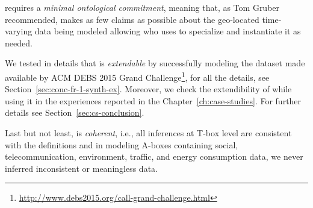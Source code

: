 \frappe{} requires a \textit{minimal ontological commitment}, meaning that, as Tom Gruber recommended, \frappe{} makes as few claims as possible about the geo-located time-varying data being modeled allowing who uses \frappe{} to specialize and instantiate it as needed.

We tested in details that \frappe{} is \textit{extendable} by successfully modeling the dataset made available by ACM DEBS 2015 Grand Challenge\footnote{\url{http://www.debs2015.org/call-grand-challenge.html}}, for all the details, see Section~\ref{sec:conc-fr-1-synth-ex}.
Moreover, we check the extendibility of \frappe{} while using it in the experiences reported in the Chapter~\ref{ch:case-studies}. For further details see Section~\ref{sec:cs-conclusion}.

Last but not least, \frappe{} is \textit{coherent}, i.e., all \frappe{} inferences at T-box level are consistent with the definitions and in modeling A-boxes containing social, telecommunication, environment, traffic, and energy consumption data, we never inferred inconsistent or meaningless data.

